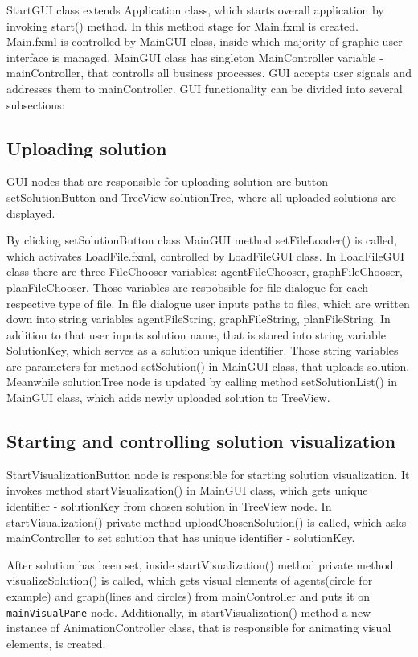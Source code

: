 \documentclass[thesis=B,english]{FITthesis}[2019/12/23]
\begin{document}
StartGUI class extends Application class, which starts overall application by invoking start() method. In this method stage for Main.fxml is created. Main.fxml is controlled by MainGUI class, inside which majority of graphic user interface is managed. MainGUI class has singleton MainController variable - mainController, that controlls all business processes. GUI accepts user signals and addresses them to mainController. GUI functionality can be divided into several subsections:

\subsection{Uploading solution}

GUI nodes that are responsible for uploading solution are button setSolutionButton and TreeView solutionTree, where all uploaded solutions are displayed.

By clicking setSolutionButton class MainGUI method setFileLoader() is called, which activates LoadFile.fxml, controlled by LoadFileGUI class. In LoadFileGUI class there are three FileChooser variables: agentFileChooser, graphFileChooser, planFileChooser. Those variables are respobsible for file dialogue for each respective type of file. In file dialogue user inputs paths to files, which are written down into string variables agentFileString, graphFileString, planFileString. In addition to that user inputs solution name, that is stored into string variable SolutionKey, which serves as a solution unique identifier. Those string variables are parameters for method setSolution() in MainGUI class, that uploads solution. Meanwhile solutionTree node is updated by calling method setSolutionList() in MainGUI class, which adds newly uploaded solution to TreeView.

\subsection{Starting and controlling solution visualization}

StartVisualizationButton node is responsible for starting solution visualization. It invokes method startVisualization() in MainGUI class, which gets unique identifier - solutionKey from chosen solution in TreeView node. In startVisualization() private method uploadChosenSolution() is called, which asks mainController to set solution that has unique identifier - solutionKey.

After solution has been set, inside startVisualization() method private method visualizeSolution() is called, which gets visual elements of agents(circle for example) and graph(lines and circles) from mainController and puts it on \verb|mainVisualPane| node. Additionally, in startVisualization() method a new instance of AnimationController class, that is responsible for animating visual elements, is created. 
\end{document}
